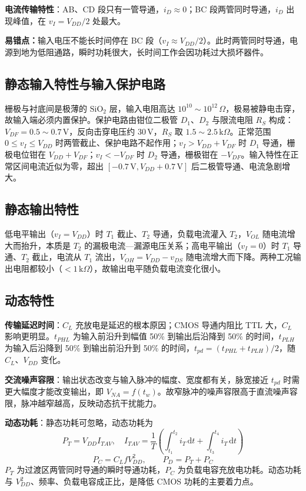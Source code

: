 \textbf{电流传输特性}：AB、CD 段只有一管导通，\(i_D\approx0\)；BC 段两管同时导通，\(i_D\) 出现峰值，在 \(v_I=V_{DD}/2\) 处最大。

\textbf{易错点：}输入电压不能长时间停在 BC 段（\(v_I\approx V_{DD}/2\)）。此时两管同时导通，电源到地为低阻通路，瞬时功耗很大，长时间工作会因功耗过大损坏器件。

\subsection{静态输入特性与输入保护电路}
栅极与衬底间是极薄的 \(\mathrm{SiO_2}\) 层，输入电阻高达 \(10^{10}\sim10^{12}\,\Omega\)，极易被静电击穿，故输入端必须内置保护。保护电路由钳位二极管 \(D_1\)、\(D_2\) 与限流电阻 \(R_S\) 构成：\(V_{DF}=0.5\sim0.7\,\mathrm{V}\)，反向击穿电压约 \(30\,\mathrm{V}\)，\(R_S\) 取 \(1.5\sim2.5\,\mathrm{k}\Omega\)。正常范围 \(0\le v_I\le V_{DD}\) 时两管截止、保护电路不起作用；\(v_I>V_{DD}+V_{DF}\) 时 \(D_1\) 导通，栅极电位钳在 \(V_{DD}+V_{DF}\)；\(v_I<-V_{DF}\) 时 \(D_2\) 导通，栅极钳在 \(-V_{DF}\)。输入特性在正常区间电流近似为零，超出 \([-0.7\,\mathrm{V},V_{DD}+0.7\,\mathrm{V}]\) 后二极管导通、电流急剧增大。

\subsection{静态输出特性}
低电平输出（\(v_I=V_{DD}\)）时 \(T_1\) 截止、\(T_2\) 导通，负载电流灌入 \(T_2\)，\(V_{OL}\) 随电流增大而抬升，本质是 \(T_2\) 的漏极电流—漏源电压关系；高电平输出（\(v_I=0\)）时 \(T_1\) 导通、\(T_2\) 截止，电流从 \(T_1\) 流出，\(V_{OH}=V_{DD}-v_{DS}\) 随电流增大而下降。两种工况输出电阻都较小（\(<1\,\mathrm{k}\Omega\)），故输出电平随负载电流变化很小。

\subsection{动态特性}
\textbf{传输延迟时间}：\(C_L\) 充放电是延迟的根本原因；CMOS 导通内阻比 TTL 大，\(C_L\) 影响更明显。\(t_{PHL}\) 为输入前沿升到幅值 50\% 到输出后沿降到 50\% 的时间，\(t_{PLH}\) 为输入后沿降到 50\% 到输出前沿升到 50\% 的时间，\(t_{pd}=(t_{PHL}+t_{PLH})/2\)，随 \(C_L\)、\(V_{DD}\) 变化。

\textbf{交流噪声容限}：输出状态改变与输入脉冲的幅度、宽度都有关，脉宽接近 \(t_{pd}\) 时需更大幅度才能改变输出，即 \(V_{NA}=f(t_w)\)。故窄脉冲的噪声容限高于直流噪声容限，脉冲越窄越高，反映动态抗干扰能力。

\textbf{动态功耗}：静态功耗可忽略，动态功耗为
\[
P_T=V_{DD}I_{TAV},\quad
I_{TAV}=\frac{1}{T}\left(\int_{t_1}^{t_2}i_T\,\mathrm{d}t+\int_{t_3}^{t_4}i_T\,\mathrm{d}t\right)
\]
\[
P_C=C_LfV_{DD}^{2},\qquad P_D=P_T+P_C
\]
\(P_T\) 为过渡区两管同时导通的瞬时导通功耗，\(P_C\) 为负载电容充放电功耗。动态功耗与 \(V_{DD}^2\)、频率、负载电容成正比，是降低 CMOS 功耗的主要着力点。

